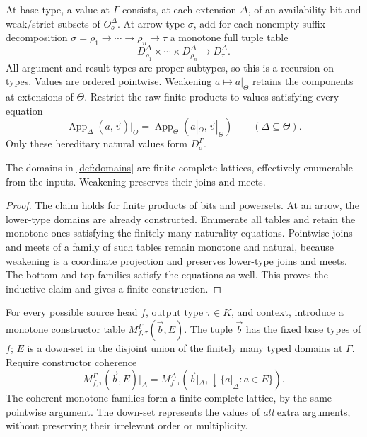 \documentclass[11pt,a4paper]{article}
\begin{document}
\begin{definition}\label{def:domains}
At base type, a value at $\Gamma$ consists, at each extension $\Delta$, of
an availability bit and weak/strict subsets of $O_o^\Delta$.
At arrow type $\sigma$, add for each nonempty suffix decomposition
$\sigma=\rho_1\to\cdots\to\rho_n\to\tau$ a monotone full tuple table
\[
 D_{\rho_1}^\Delta\times\cdots\times D_{\rho_n}^\Delta
       \longrightarrow D_\tau^\Delta.
\]
All argument and result types are proper subtypes, so this is a recursion
on types.  Values are ordered pointwise.  Weakening $a\mapsto a|_\Theta$
retains the components at extensions of $\Theta$.
Restrict the raw finite products to values satisfying every equation
\[
 \operatorname{App}_\Delta(a,\vec v)|_\Theta
   =\operatorname{App}_\Theta(a|_\Theta,\vec v|_\Theta)
       \qquad(\Delta\subseteq\Theta).
\]
Only these hereditary natural values form $D_\sigma^\Gamma$.
\end{definition}

\begin{lemma}\label{lem:lattices}
The domains in \ref{def:domains} are finite complete lattices, effectively
enumerable from the inputs.  Weakening preserves their joins and meets.
\end{lemma}
\begin{proof}
The claim holds for finite products of bits and powersets.  At an arrow,
the lower-type domains are already constructed.  Enumerate all tables and
retain the monotone ones satisfying the finitely many naturality equations.
Pointwise joins and meets of a family of such tables remain monotone and
natural, because weakening is a coordinate projection and preserves lower-type
joins and meets.  The bottom and top families satisfy the equations as well.
This proves the inductive claim and gives a finite construction.
\end{proof}

For every possible source head $f$, output type $\tau\in K$, and context,
introduce a monotone constructor table $M_{f,\tau}^\Gamma(\vec b,E)$.
The tuple $\vec b$ has the fixed base types of $f$; $E$ is a down-set in
the disjoint union of the finitely many typed domains at $\Gamma$.
Require constructor coherence
\begin{equation}\label{eq:constructorcoherence}
 M_{f,\tau}^\Gamma(\vec b,E)|_\Delta
 =M_{f,\tau}^\Delta(\vec b|_\Delta,
          {\downarrow}\{a|_\Delta:a\in E\}).
\end{equation}
The coherent monotone families form a finite complete lattice, by the same
pointwise argument.  The down-set represents the values of \emph{all} extra
arguments, without preserving their irrelevant order or multiplicity.
\end{document}
